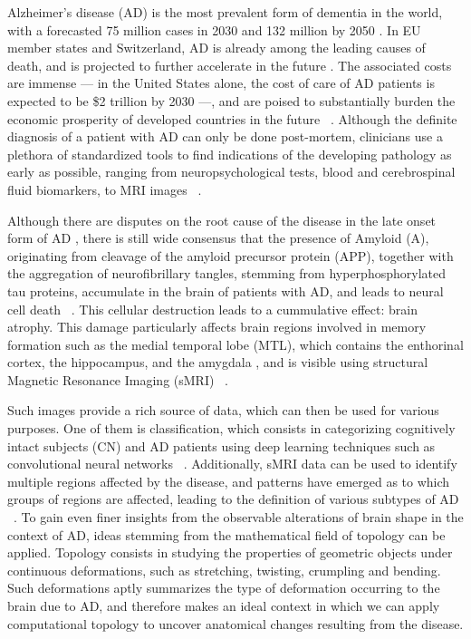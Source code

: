 \documentclass{article}
\begin{document}
Alzheimer's disease (AD) is the most prevalent form of dementia in the world, with a forecasted 75 million cases in 2030 and 132 million by 2050 \citep{world2017global}. In EU member states and Switzerland, AD is already among the leading causes of death, and is projected to further accelerate in the future \citep{sleeman2019escalating}. The associated costs are immense --- in the United States alone, the cost of care of AD patients is expected to be \$2 trillion by 2030 ---, and are poised to substantially burden the economic prosperity of developed countries in the future ~\citep{world2017global}. Although the definite diagnosis of a patient with AD can only be done post-mortem, clinicians use a plethora of standardized tools to find indications of the developing pathology as early as possible, ranging from neuropsychological tests, blood and cerebrospinal fluid biomarkers, to MRI images ~\citep{mckhann2011diagnosis, lehmann2016biomarkers, smits2012early}.

Although there are disputes on the root cause of the disease in the late onset form of AD \citep{hur2020innate, fulop2018can, tharp2013origins}, there is still wide consensus that the presence of Amyloid \textbeta{} (A\textbeta{}), originating from cleavage of the amyloid precursor protein (APP), together with the aggregation of neurofibrillary tangles, stemming from hyperphosphorylated tau proteins, accumulate in the brain of patients with AD, and leads to neural cell death ~\citep{da2016insights}. This cellular destruction leads to a cummulative effect: brain atrophy. This damage particularly affects brain regions involved in memory formation such as the medial temporal lobe (MTL), which contains the enthorinal cortex, the hippocampus, and the amygdala \citep{goedert2006century}, and is visible using structural Magnetic Resonance Imaging (sMRI) ~\citep{frisoni2010clinical}.

Such images provide a rich source of data, which can then be used for various purposes. One of them is classification, which consists in categorizing cognitively intact subjects (CN) and AD patients using deep learning techniques such as convolutional neural networks ~\citep{wen2020convolutional}. Additionally, sMRI data can be used to identify multiple regions affected by the disease, and patterns have emerged as to which groups of regions are affected, leading to the definition of various subtypes of AD ~\citep{poulakis2018heterogeneous,tijms2020pathophysiological}. To gain even finer insights from the observable alterations of brain shape in the context of AD, ideas stemming from the mathematical field of topology can be applied. Topology consists in studying the properties of geometric objects under continuous deformations, such as stretching, twisting, crumpling and bending. Such deformations aptly summarizes the type of deformation occurring to the brain due to AD, and therefore makes an ideal context in which we can apply computational topology to uncover anatomical changes resulting from the disease.
\end{document}
